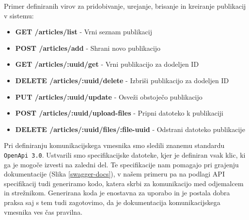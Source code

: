 \documentclass[a4paper, 12pt]{book}
\begin{document}
Primer definiranih virov za pridobivanje, urejanje, brisanje in kreiranje publikacij v sistemu:
\begin{description}
   
\begin{itemize}
    \item \textbf{GET /articles/list} - Vrni seznam publikacij
    \item \textbf{POST /articles/add} - Shrani novo publikacijo
    \item \textbf{GET /articles/:uuid/get} - Vrni publikacijo za dodeljen ID 
    \item \textbf{DELETE /articles/:uuid/delete} - Izbriši publikacijo za dodeljen ID
    \item \textbf{PUT /articles/:uuid/update} - Osveži obstoječo publikacijo
    \item \textbf{POST /articles/:uuid/upload-files} - Pripni datoteko k publikaciji
    \item \textbf{DELETE /articles/:uuid/files/:file-uuid} - Odstrani datoteko publikacije
\end{itemize}
\end{description}

Pri definiranju komunikacijskega vmesnika smo sledili znanemu standardu \verb=OpenApi 3.0=. Ustvarili smo specifikacijske datoteke, kjer je definiran vsak klic, ki ga je mogoče izvesti na zaledni del. Te specifikacije nam pomagajo pri grajenju dokumentacije (Slika \ref{swagger-docs}), v našem primeru pa na podlagi API specifikacij tudi generiramo kodo, katera skrbi za komunikacijo med odjemalcem in strežnikom. Generirana koda je enostavna za uporabo in je postala dobra praksa saj s tem tudi zagotovimo, da je dokumentacija komunikacijskega vmesnika ves čas pravilna. 
\end{document}
